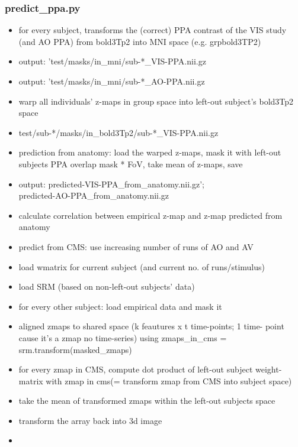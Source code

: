 \subsubsection{predict\_ppa.py}
\begin{itemize}
    \item for every subject, transforms the (correct) PPA contrast of the VIS
        study (and AO PPA) from bold3Tp2 into MNI space (e.g. grpbold3TP2)
    \item output: 'test/masks/in\_mni/sub-*\_VIS-PPA.nii.gz
    \item output: 'test/masks/in\_mni/sub-*\_AO-PPA.nii.gz
    \item warp all individuals' z-maps in group space into left-out subject's
    bold3Tp2 space
    \item test/sub-*/masks/in\_bold3Tp2/sub-*\_VIS-PPA.nii.gz
    \item prediction from anatomy: load the warped z-maps, mask it with left-out
        subjects PPA overlap mask * FoV, take mean of z-maps, save
    \item output: predicted-VIS-PPA\_from\_anatomy.nii.gz'; \\
        predicted-AO-PPA\_from\_anatomy.nii.gz
    \item calculate correlation between empirical z-map and z-map predicted from
        anatomy
    \item predict from CMS: use increasing number of runs of AO and AV
    \item load wmatrix for current subject (and current no. of runs/stimulus)
    \item load SRM (based on non-left-out subjects' data)
    \item for every other subject: load empirical data and mask it
    \item aligned zmaps to shared space (k feautures x t time-points; 1 time-
        point cause it's a zmap no time-series) using zmaps\_in\_cms =
        srm.transform(masked\_zmaps)
    \item for every zmap in CMS, compute dot product of left-out subject
        weight-matrix with zmap in cms(= transform zmap from CMS into subject
        space)
    \item take the mean of transformed zmaps within the left-out subjects space
    \item transform the array back into 3d image
    \item
\end{itemize}


